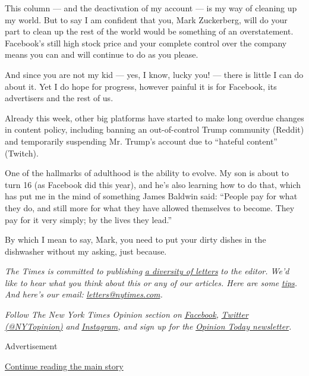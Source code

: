 This column --- and the deactivation of my account --- is my way of
cleaning up my world. But to say I am confident that you, Mark
Zuckerberg, will do your part to clean up the rest of the world would be
something of an overstatement. Facebook's still high stock price and
your complete control over the company means you can and will continue
to do as you please.

And since you are not my kid --- yes, I know, lucky you! --- there is
little I can do about it. Yet I do hope for progress, however painful it
is for Facebook, its advertisers and the rest of us.

Already this week, other big platforms have started to make long overdue
changes in content policy, including banning an out-of-control Trump
community (Reddit) and temporarily suspending Mr. Trump's account due to
``hateful content'' (Twitch).

One of the hallmarks of adulthood is the ability to evolve. My son is
about to turn 16 (as Facebook did this year), and he's also learning how
to do that, which has put me in the mind of something James Baldwin
said: ``People pay for what they do, and still more for what they have
allowed themselves to become. They pay for it very simply; by the lives
they lead.''

By which I mean to say, Mark, you need to put your dirty dishes in the
dishwasher without my asking, just because.

\emph{The Times is committed to publishing}
\href{https://www.nytimes.com/2019/01/31/opinion/letters/letters-to-editor-new-york-times-women.html}{\emph{a
diversity of letters}} \emph{to the editor. We'd like to hear what you
think about this or any of our articles. Here are some}
\href{https://help.nytimes.com/hc/en-us/articles/115014925288-How-to-submit-a-letter-to-the-editor}{\emph{tips}}\emph{.
And here's our email:}
\href{mailto:letters@nytimes.com}{\emph{letters@nytimes.com}}\emph{.}

\emph{Follow The New York Times Opinion section on}
\href{https://www.facebook.com/nytopinion}{\emph{Facebook}}\emph{,}
\href{http://twitter.com/NYTOpinion}{\emph{Twitter (@NYTopinion)}}
\emph{and}
\href{https://www.instagram.com/nytopinion/}{\emph{Instagram}}\emph{,
and sign up for the}
\href{http://www.nytimes.com/newsletters/opiniontoday/}{\emph{Opinion
Today newsletter}}\emph{.}

Advertisement

\protect\hyperlink{after-bottom}{Continue reading the main story}

